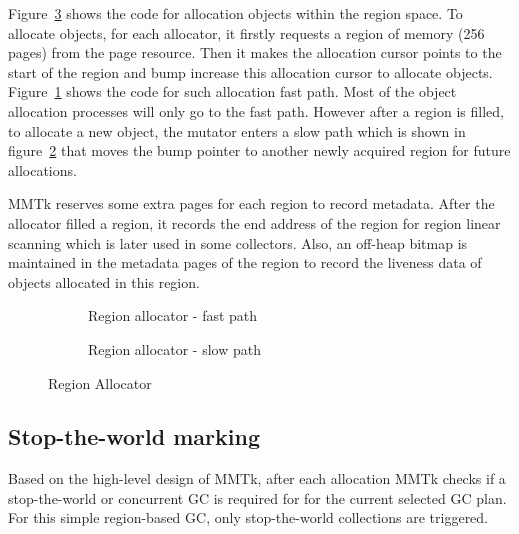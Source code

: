 Figure~\ref{fig:allocator} shows the code for allocation objects within the region space.
To allocate objects, for each allocator, it firstly requests a region of memory (256 pages) from the page resource.
Then it makes the allocation cursor points to the start of the region and bump increase this
allocation cursor to allocate objects. Figure~\ref{fig:allocator:fast} shows the code for such
allocation fast path. Most of the object allocation processes will only go to the
fast path. 
However after a region is filled, to allocate a new object, the mutator enters a slow path
which is shown in figure~\ref{fig:allocator:slow} that moves the bump pointer to another newly acquired region for future allocations.

MMTk reserves some extra pages for each region to record metadata.
After the allocator filled a region, it records the end address of the region for 
region linear scanning which is later used in some collectors. Also, an off-heap bitmap is
maintained in the metadata pages of the region to record the liveness data of objects allocated
in this region.

\begin{figure}
  \centering
  \begin{subfigure}[a]{\textwidth}
    
    \caption{Region allocator - fast path}
    \label{fig:allocator:fast}
  \end{subfigure}

  \begin{subfigure}[b]{\textwidth}
    
    \caption{Region allocator - slow path}
    \label{fig:allocator:slow}
  \end{subfigure}

  \caption{Region Allocator}
  \label{fig:allocator}
\end{figure}

\subsection{Stop-the-world marking}

Based on the high-level design of MMTk, after each allocation MMTk checks if a stop-the-world
or concurrent GC is required for for the current selected GC plan.
For this simple region-based GC, only stop-the-world collections are triggered.

